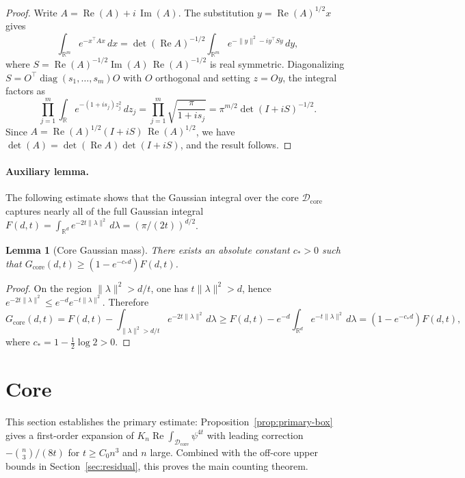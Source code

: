\documentclass[11pt]{article}
\newtheorem{lemma}[theorem]{Lemma}
\theoremstyle{definition}
\newcommand{\R}{\mathbb{R}}
\newcommand{\corereg}{\mathcal{D}_\mathrm{core}}
\newcommand{\RePart}{\operatorname{Re}}
\newcommand{\ImPart}{\operatorname{Im}}
\newcommand{\core}{G_{\mathrm{core}}}
\begin{document}
\begin{proof}
Write \(A=\RePart(A)+i\,\ImPart(A)\). The substitution \(y=\RePart(A)^{1/2}x\) gives
\[
  \int_{\R^m}e^{-x^\top Ax}\,dx
  =\det(\RePart A)^{-1/2}\int_{\R^m}e^{-\|y\|^2-iy^\top Sy}\,dy,
\]
where \(S=\RePart(A)^{-1/2}\ImPart(A)\,\RePart(A)^{-1/2}\) is real symmetric.
Diagonalizing \(S=O^\top\!\operatorname{diag}(s_1,\dots,s_m)O\) with \(O\) orthogonal and setting \(z=Oy\), the integral factors as
\[
  \prod_{j=1}^m\int_\R e^{-(1+is_j)z_j^2}\,dz_j
  =\prod_{j=1}^m\sqrt{\frac{\pi}{1+is_j}}
  =\pi^{m/2}\det(I+iS)^{-1/2}.
\]
Since \(A=\RePart(A)^{1/2}(I+iS)\,\RePart(A)^{1/2}\), we have \(\det(A)=\det(\RePart A)\det(I+iS)\), and the result follows.
\end{proof}

\paragraph{Auxiliary lemma.}
The following estimate shows that the Gaussian integral over the core \(\corereg\) captures nearly all of the full Gaussian integral \(F(d,t)=\int_{\R^d}e^{-2t\|\lambda\|^2}\,d\lambda=(\pi/(2t))^{d/2}\).

\begin{lemma}[Core Gaussian mass]\label{lem:inner-core}
There exists an absolute constant \(c_*>0\) such that
\(\core(d,t)\ge (1-e^{-c_*d})F(d,t)\).
\end{lemma}

\begin{proof}
On the region \(\|\lambda\|^2>d/t\), one has \(t\|\lambda\|^2>d\), hence
\(e^{-2t\|\lambda\|^2}\le e^{-d}e^{-t\|\lambda\|^2}\). Therefore
\[
  \core(d,t)
  =F(d,t)-\int_{\|\lambda\|^2>d/t}e^{-2t\|\lambda\|^2}\,d\lambda
  \ge F(d,t)-e^{-d}\int_{\R^d}e^{-t\|\lambda\|^2}\,d\lambda
  =(1-e^{-c_*d})F(d,t),
\]
where \(c_*=1-\frac12\log 2>0\).
\end{proof}

\section{Core}\label{sec:core}

This section establishes the primary estimate: Proposition~\ref{prop:primary-box} gives a first-order expansion of \(K_n\RePart\int_{\corereg}\psi^{4t}\) with leading correction \(-\binom{n}{3}/(8t)\) for \(t\ge C_0n^3\) and \(n\) large. Combined with the off-core upper bounds in Section~\ref{sec:residual}, this proves the main counting theorem.
\end{document}
